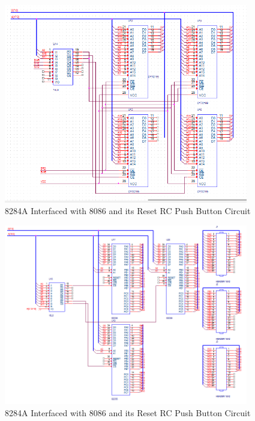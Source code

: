         \begin{figure}[ht]
            \begin{center}
                \includegraphics[width=0.95\textwidth]{figures/schematics/page4.png}
                \caption{8284A Interfaced with 8086 and its Reset RC Push Button Circuit} \label{fig:page4}
            \end{center}
        \end{figure}

        \begin{figure}[ht]
            \begin{center}
                \includegraphics[width=0.95\textwidth]{figures/schematics/page5.png}
                \caption{8284A Interfaced with 8086 and its Reset RC Push Button Circuit} \label{fig:page5}
            \end{center}
        \end{figure}

